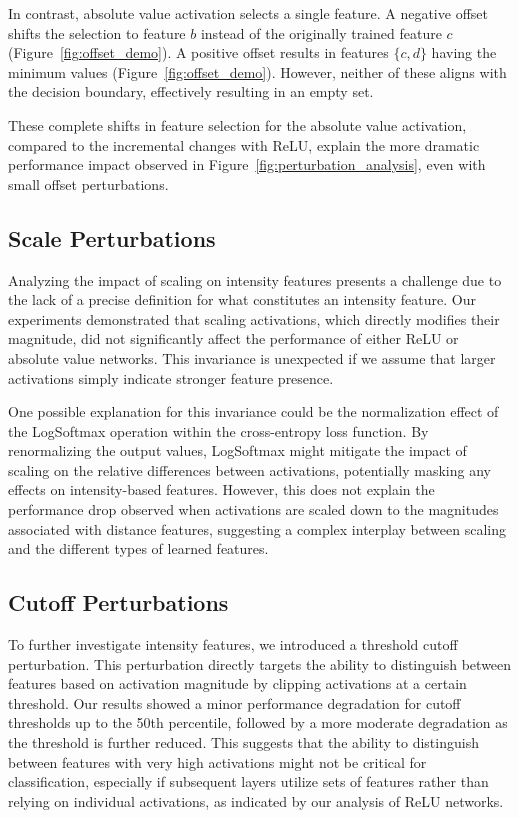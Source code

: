 In contrast, absolute value activation selects a single feature. A negative offset shifts the selection to feature $b$ instead of the originally trained feature $c$ (Figure~\ref{fig:offset_demo}). A positive offset results in features $\{c, d\}$ having the minimum values (Figure~\ref{fig:offset_demo}). However, neither of these aligns with the decision boundary, effectively resulting in an empty set.

These complete shifts in feature selection for the absolute value activation, compared to the incremental changes with ReLU, explain the more dramatic performance impact observed in Figure~\ref{fig:perturbation_analysis}, even with small offset perturbations.

\subsection{Scale Perturbations}

Analyzing the impact of scaling on intensity features presents a challenge due to the lack of a precise definition for what constitutes an intensity feature.  Our experiments demonstrated that scaling activations, which directly modifies their magnitude, did not significantly affect the performance of either ReLU or absolute value networks.  This invariance is unexpected if we assume that larger activations simply indicate stronger feature presence.

One possible explanation for this invariance could be the normalization effect of the LogSoftmax operation within the cross-entropy loss function.  By renormalizing the output values, LogSoftmax might mitigate the impact of scaling on the relative differences between activations, potentially masking any effects on intensity-based features.  However, this does not explain the performance drop observed when activations are scaled down to the magnitudes associated with distance features, suggesting a complex interplay between scaling and the different types of learned features.

\subsection{Cutoff Perturbations}

To further investigate intensity features, we introduced a threshold cutoff perturbation.  This perturbation directly targets the ability to distinguish between features based on activation magnitude by clipping activations at a certain threshold.  Our results showed a minor performance degradation for cutoff thresholds up to the 50th percentile, followed by a more moderate degradation as the threshold is further reduced.  This suggests that the ability to distinguish between features with very high activations might not be critical for classification, especially if subsequent layers utilize sets of features rather than relying on individual activations, as indicated by our analysis of ReLU networks.

